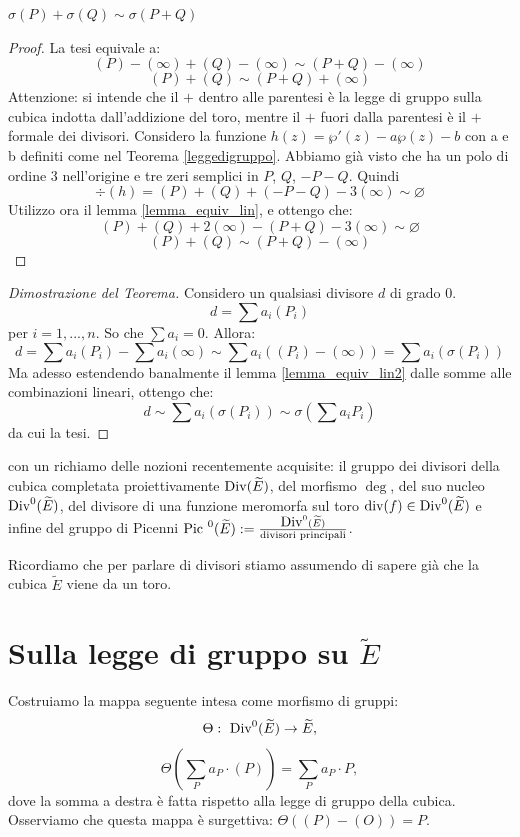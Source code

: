 \begin{lemma}
  \label{lemma_equiv_lin2}
$\sigma(P)+\sigma(Q) \sim \sigma (P+Q)$
\end{lemma}
\begin{proof}
La tesi equivale a:
$$(P)-(\infty)+(Q)-(\infty) \sim (P+Q)-(\infty)$$
$$(P)+(Q)\sim (P+Q)+(\infty)$$
Attenzione: si intende che il $+$ dentro alle parentesi è la legge di gruppo sulla cubica indotta dall'addizione del toro, mentre il $+$ fuori dalla parentesi è il $+$ formale dei divisori.
Considero la funzione $h(z) = \wp'(z) - a \wp(z) - b$ con a e b definiti come nel Teorema \ref{leggedigruppo}. Abbiamo già visto che ha un polo di ordine $3$ nell'origine e tre zeri semplici in $P$, $Q$, $-P-Q$. Quindi $$\div(h)=(P)+(Q)+(-P-Q)-3(\infty) \sim \varnothing$$
Utilizzo ora il lemma \ref{lemma_equiv_lin}, e ottengo che:
$$(P)+(Q)+2(\infty)-(P+Q)-3(\infty) \sim \varnothing$$
$$(P)+(Q) \sim (P+Q)-(\infty)$$
\end{proof}

\begin{proof}[Dimostrazione del Teorema]
Considero un qualsiasi divisore $d$ di grado $0$.
$$d=\sum a_i (P_i)$$
per $i=1,...,n$. So che $\sum a_i=0$. Allora:
$$d = \sum a_i (P_i)-\sum a_i (\infty) \sim \sum a_i ((P_i)-(\infty))=\sum a_i (\sigma(P_i))$$
Ma adesso estendendo banalmente il lemma \ref{lemma_equiv_lin2} dalle somme alle combinazioni lineari, ottengo che:
$$d \sim \sum a_i (\sigma(P_i)) \sim \sigma(\sum a_i P_i)$$
da cui la tesi.
\end{proof}


 con un richiamo delle nozioni recentemente acquisite: il gruppo dei divisori della cubica completata proiettivamente $\mbox{Div}(\widetilde{E})$, del morfismo $\deg$, del suo nucleo $\mbox{Div}^0(\widetilde{E})$, del divisore di una funzione meromorfa sul toro $\mbox{div}(f)\in\mbox{Div}^0(\widetilde{E})$ e infine del gruppo di Picenni $\mbox{Pic }^0(\widetilde{E}) := \frac{\mbox{Div}^0(\widetilde{E})}{\text{divisori principali}}$.

Ricordiamo che per parlare di divisori stiamo assumendo di sapere già che la cubica $\widetilde{E}$ viene da un toro.

\section{Sulla legge di gruppo su $\widetilde{E}$}
Costruiamo la mappa seguente intesa come morfismo di gruppi:
$$
\Theta: \ \mbox{Div}^0(\widetilde{E})\rightarrow \widetilde{E},
$$
$$
\Theta\left(\sum_P a_P \cdot (P)\right)=\sum_P a_P \cdot P,
$$
dove la somma a destra è fatta rispetto alla legge di gruppo della cubica.
Osserviamo che questa mappa è surgettiva: $\Theta((P)-(O))=P$.

